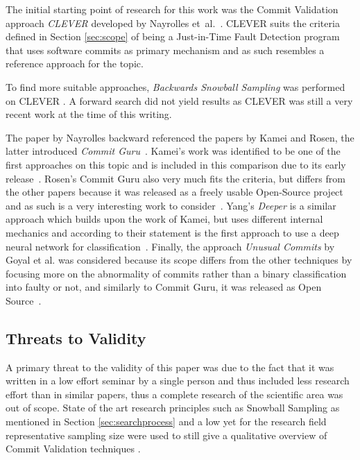 The initial starting point of research for this work was the Commit Validation approach \textit{CLEVER} developed by Nayrolles et~al.~\cite{Nayrolles2018}. CLEVER suits the criteria defined in Section \ref{sec:scope} of being a Just-in-Time Fault Detection program that uses software commits as primary mechanism and as such resembles a reference approach for the topic.  

To find more suitable approaches, \textit{Backwards Snowball Sampling} was performed on CLEVER \cite{10.2307/2237615}. A forward search did not yield results as CLEVER was still a very recent work at the time of this writing.

The paper by Nayrolles backward referenced the papers by Kamei and Rosen, the latter introduced \textit{Commit Guru}~\cite{Nayrolles2018}. Kamei's work was identified to be one of the first approaches on this topic and is included in this comparison due to its early release~\cite{Kamei2013}. Rosen's Commit Guru also very much fits the criteria, but differs from the other papers because it was released as a freely usable Open-Source project and as such is a very interesting work to consider~\cite{Rosen2015}. Yang's \textit{Deeper} is a similar approach which builds upon the work of Kamei, but uses different internal mechanics and according to their statement is the first approach to use a deep neural network for classification~\cite{Yang2015}. Finally, the approach \textit{Unusual Commits} by Goyal et al. was considered because its scope differs from the other techniques by focusing more on the abnormality of commits rather than a binary classification into faulty or not, and similarly to Commit Guru, it was released as Open Source~\cite{Goyal2017}.

\subsection{Threats to Validity}
\label{sec:threatstovalidity}

A primary threat to the validity of this paper was due to the fact that it was written in a low effort seminar by a single person and thus included less research effort than in similar papers, thus a complete research of the scientific area was out of scope. State of the art research principles such as Snowball Sampling as mentioned in Section \ref{sec:searchprocess} and a low yet for the research field representative sampling size were used to still give a qualitative overview of Commit Validation techniques \cite{10.2307/2237615}.

